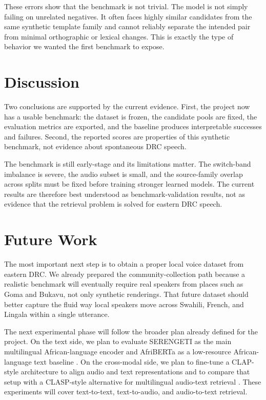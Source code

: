 \documentclass[11pt,twocolumn]{article}
\begin{document}
These errors show that the benchmark is not trivial. The model is not simply failing on unrelated negatives. It often faces highly similar candidates from the same synthetic template family and cannot reliably separate the intended pair from minimal orthographic or lexical changes. This is exactly the type of behavior we wanted the first benchmark to expose.

\section{Discussion}
Two conclusions are supported by the current evidence. First, the project now has a usable benchmark: the dataset is frozen, the candidate pools are fixed, the evaluation metrics are exported, and the baseline produces interpretable successes and failures. Second, the reported scores are properties of this synthetic benchmark, not evidence about spontaneous DRC speech.

The benchmark is still early-stage and its limitations matter. The switch-band imbalance is severe, the audio subset is small, and the source-family overlap across splits must be fixed before training stronger learned models. The current results are therefore best understood as benchmark-validation results, not as evidence that the retrieval problem is solved for eastern DRC speech.

\section{Future Work}
The most important next step is to obtain a proper local voice dataset from eastern DRC. We already prepared the community-collection path because a realistic benchmark will eventually require real speakers from places such as Goma and Bukavu, not only synthetic renderings. That future dataset should better capture the fluid way local speakers move across Swahili, French, and Lingala within a single utterance.

The next experimental phase will follow the broader plan already defined for the project. On the text side, we plan to evaluate SERENGETI as the main multilingual African-language encoder and AfriBERTa as a low-resource African-language text baseline \cite{serengeti}\cite{afriberta}. On the cross-modal side, we plan to fine-tune a CLAP-style architecture to align audio and text representations and to compare that setup with a CLASP-style alternative for multilingual audio-text retrieval \cite{elizalde2019crossmodal}\cite{nuga2025multilingual}. These experiments will cover text-to-text, text-to-audio, and audio-to-text retrieval.
\end{document}
